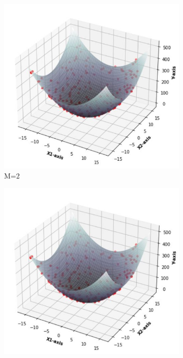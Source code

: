 \documentclass[11pt]{article}
\begin{document}
\begin{figure}[h]
\centering
	\begin{subfigure}[b]{0.4\textwidth}
	\centering
	\includegraphics[scale=0.5]{dataset2_200_lambda0_m2funcplot.jpg}
	\caption{    M=2}
	\label{fig:fig2.1.3.1}
	\end{subfigure}
	\hfill
	\begin{subfigure}[b]{0.4\textwidth}
	\centering
	\includegraphics[scale=0.5]{dataset2_200_lambda0_m3funcplot.jpg}

\end{subfigure}
\end{figure}
\end{document}
